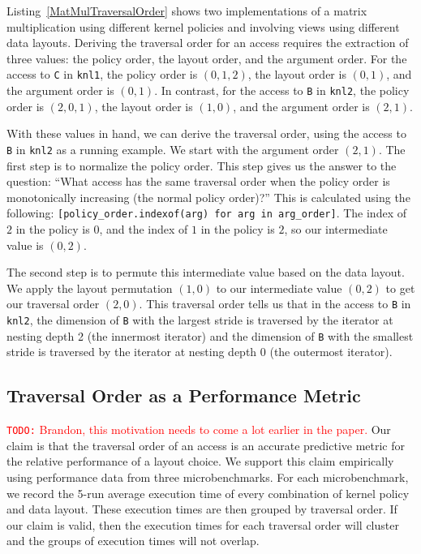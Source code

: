\documentclass[sigconf, table]{acmart}
\newcommand{\todo}[1]{{\textcolor{red}{{\tt{TODO:}}\,\,#1 }}}
\begin{document}
Listing~\ref{MatMulTraversalOrder} shows two implementations of a matrix multiplication using different kernel policies and involving views using different data layouts.
Deriving the traversal order for an access requires the extraction of three values: the policy order, the layout order, and the argument order. 
For the access to \verb.C. in \verb.knl1., the policy order is $(0,1,2)$, the layout order is $(0,1)$, and the argument order is $(0,1)$. 
In contrast, for the access to \verb.B. in \verb.knl2., the policy order is $(2,0,1)$, the layout order is $(1,0)$, and the argument order is $(2,1)$. 

With these values in hand, we can derive the traversal order, using the access to \verb.B. in \verb.knl2. as a running example. 
We start with the argument order $(2,1)$.
The first step is to normalize the policy order.
This step gives us the answer to the question: \enquote{What access has the same traversal order when the policy order is monotonically increasing (the normal policy order)?}
This is calculated using the following: \verb,[policy_order.indexof(arg) for arg in arg_order],. 
The index of $2$ in the policy is $0$, and the index of $1$ in the policy is $2$, so our intermediate value is $(0,2)$. 

The second step is to permute this intermediate value based on the data layout. 
We apply the layout permutation $(1,0)$ to our intermediate value $(0,2)$ to get our traversal order $(2,0)$. 
This traversal order tells us that in the access to \verb.B. in \verb.knl2., the dimension of \verb.B. with the largest stride is traversed by the iterator at nesting depth 2 (the innermost iterator) and the dimension of \verb.B. with the smallest stride is traversed by the iterator at nesting depth 0 (the outermost iterator). 

\subsection{Traversal Order as a Performance Metric}

\todo{Brandon, this motivation needs to come a lot earlier in the paper.}
Our claim is that the traversal order of an access is an accurate predictive metric for the relative performance of a layout choice. 
We support this claim empirically using performance data from three microbenchmarks.
For each microbenchmark, we record the 5-run average execution time of every combination of kernel policy and data layout. 
These execution times are then grouped by traversal order.
If our claim is valid, then the execution times for each traversal order will cluster and the groups of execution times will not overlap.
\end{document}
